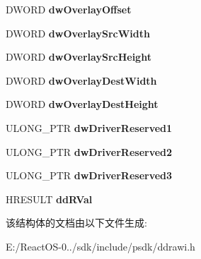 \begin{DoxyCompactItemize}
\item 
\mbox{\label{struct___d_d_h_a_l___s_y_n_c_s_u_r_f_a_c_e_d_a_t_a_a6bc2e303a96afd5b994e5476ff025c7b}} 
D\+W\+O\+RD {\bfseries dw\+Overlay\+Offset}
\item 
\mbox{\label{struct___d_d_h_a_l___s_y_n_c_s_u_r_f_a_c_e_d_a_t_a_a0ebcbd65ee48443990535af0c691643b}} 
D\+W\+O\+RD {\bfseries dw\+Overlay\+Src\+Width}
\item 
\mbox{\label{struct___d_d_h_a_l___s_y_n_c_s_u_r_f_a_c_e_d_a_t_a_ae74dd65412b829860ed8a86c4c48a1f7}} 
D\+W\+O\+RD {\bfseries dw\+Overlay\+Src\+Height}
\item 
\mbox{\label{struct___d_d_h_a_l___s_y_n_c_s_u_r_f_a_c_e_d_a_t_a_a4be151b751e0b9dcd5c3435d9d4a6ba8}} 
D\+W\+O\+RD {\bfseries dw\+Overlay\+Dest\+Width}
\item 
\mbox{\label{struct___d_d_h_a_l___s_y_n_c_s_u_r_f_a_c_e_d_a_t_a_a2fe0f6b11f2358299aaf5280afdaa0fa}} 
D\+W\+O\+RD {\bfseries dw\+Overlay\+Dest\+Height}
\item 
\mbox{\label{struct___d_d_h_a_l___s_y_n_c_s_u_r_f_a_c_e_d_a_t_a_a5243d3c6ec0bfda0426c5921d6ce21bd}} 
U\+L\+O\+N\+G\+\_\+\+P\+TR {\bfseries dw\+Driver\+Reserved1}
\item 
\mbox{\label{struct___d_d_h_a_l___s_y_n_c_s_u_r_f_a_c_e_d_a_t_a_a464864f83aadb7fcf378db7e5b60ad7b}} 
U\+L\+O\+N\+G\+\_\+\+P\+TR {\bfseries dw\+Driver\+Reserved2}
\item 
\mbox{\label{struct___d_d_h_a_l___s_y_n_c_s_u_r_f_a_c_e_d_a_t_a_acc964bf504bd6d0e8019e6d89f53c900}} 
U\+L\+O\+N\+G\+\_\+\+P\+TR {\bfseries dw\+Driver\+Reserved3}
\item 
\mbox{\label{struct___d_d_h_a_l___s_y_n_c_s_u_r_f_a_c_e_d_a_t_a_a0702af5f91b3b6c5059288fd516be784}} 
H\+R\+E\+S\+U\+LT {\bfseries dd\+R\+Val}
\end{DoxyCompactItemize}


该结构体的文档由以下文件生成\+:\begin{DoxyCompactItemize}
\item 
E\+:/\+React\+O\+S-\/0../sdk/include/psdk/ddrawi.\+h\end{DoxyCompactItemize}
